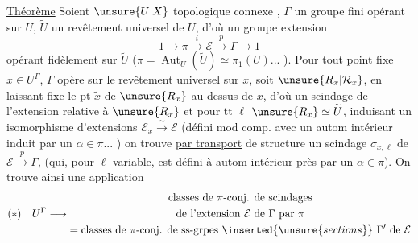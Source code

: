 \uline{Théorème} Soient $\unsure{U|X}$   topologique connexe , $\Gamma$ un groupe fini opérant  sur $U$, $\widetilde U$ un revêtement universel de $U$, d'où  un groupe extension
\[
1\longrightarrow\pi\xrightarrow{i}\mathcal E\xrightarrow{p}\Gamma\longrightarrow1
\]
opérant fidèlement sur $\widetilde U$ ($\pi=\operatorname{Aut}_U(\widetilde U)\simeq\pi_1(U)$... ).
Pour tout point fixe $x\in U^\Gamma$, $\Gamma$ opère sur le revêtement universel  sur $x$, soit  $\unsure{R_x|\mathcal R_x}$, en laissant fixe le pt  $\widetilde x$ de $\unsure{R_x}$ au dessus de $x$, d'où un scindage de l'extension relative à $\unsure{R_x}$
et pour tt   $\ell$  $\unsure{R_x}\simeq\widetilde U$, induisant un isomorphisme d'extensions $\mathcal E_x\xrightarrow{\sim}\mathcal E$ (défini  mod comp. avec un autom intérieur induit par un $\alpha\in\pi$... ) on trouve \uline{par transport} de structure un scindage $\sigma_{x,\ell}$ de $\mathcal E\xrightarrow{p}\Gamma$, (qui, pour $\ell$ variable, est défini à autom intérieur près par un $\alpha\in\pi$).
On trouve ainsi une application
\[
(*)\quad U^\Gamma\longrightarrow
\begin{gathered}
\text{classes de }\pi\text{-conj. de scindages}\\
\text{de l'extension }\mathcal E\text{ de }\Gamma\text{ par }\pi\\
=\text{classes de }\pi\text{-conj. de ss-grpes }\inserted{\unsure{sections}}\ \Gamma'\text{ de }\mathcal E
\end{gathered}
\]
